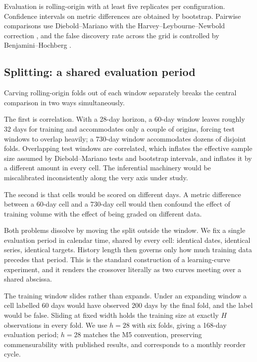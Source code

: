 \documentclass[11pt]{article}
\begin{document}
Evaluation is rolling-origin \citep{tashman2000,bergmeir2012} with at least five
replicates per configuration. Confidence intervals on metric differences are
obtained by bootstrap. Pairwise comparisons use Diebold--Mariano
\citep{diebold1995comparing} with the Harvey--Leybourne--Newbold correction
\citep{harvey1997testing}, and the false discovery rate across the grid is
controlled by Benjamini--Hochberg \citep{benjamini1995controlling}.

\subsection{Splitting: a shared evaluation period}
\label{sec:splits}

Carving rolling-origin folds out of each window separately breaks the central
comparison in two ways simultaneously.

The first is correlation. With a 28-day horizon, a 60-day window leaves roughly
32 days for training and accommodates only a couple of origins, forcing test
windows to overlap heavily; a 730-day window accommodates dozens of disjoint
folds. Overlapping test windows are correlated, which inflates the effective
sample size assumed by Diebold--Mariano tests and bootstrap intervals, and
inflates it by a different amount in every cell. The inferential machinery would
be miscalibrated inconsistently along the very axis under study.

The second is that cells would be scored on different days. A metric difference
between a 60-day cell and a 730-day cell would then confound the effect of
training volume with the effect of being graded on different data.

Both problems dissolve by moving the split outside the window. We fix a single
evaluation period in calendar time, shared by every cell: identical dates,
identical series, identical targets. History length then governs only how much
training data precedes that period. This is the standard construction of a
learning-curve experiment, and it renders the crossover literally as two curves
meeting over a shared abscissa.

The training window slides rather than expands. Under an expanding window a cell
labelled 60 days would have observed 200 days by the final fold, and the label
would be false. Sliding at fixed width holds the training size at exactly
$H$ observations in every fold. We use $h = 28$ with six folds, giving a 168-day
evaluation period; $h = 28$ matches the M5 convention, preserving
commensurability with published results, and corresponds to a monthly reorder
cycle.
\end{document}
